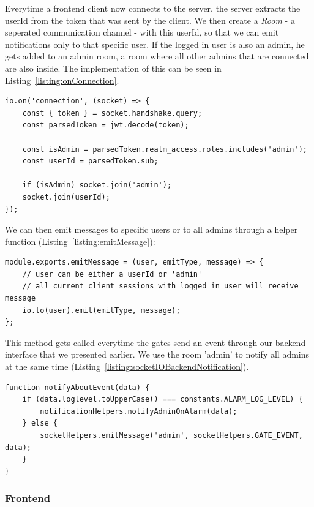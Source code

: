 Everytime a frontend client now connects to the server, the server extracts the userId from the token that was sent by the client. We then create a \emph{Room}\cite{socketio:rooms} - a seperated communication channel - with this userId, so that we can emit notifications only to that specific user. If the logged in user is also an admin, he gets added to an admin room, a room where all other admins that are connected are also inside. The implementation of this can be seen in Listing~\ref{listing:onConnection}.

\begin{lstlisting}[label={listing:onConnection},caption={Handling client connections to Socket.IO server}]
io.on('connection', (socket) => {
	const { token } = socket.handshake.query;
	const parsedToken = jwt.decode(token);

	const isAdmin = parsedToken.realm_access.roles.includes('admin');
	const userId = parsedToken.sub;

	if (isAdmin) socket.join('admin');
	socket.join(userId);
});
\end{lstlisting}

We can then emit messages to specific users or to all admins through a helper function (Listing~\ref{listing:emitMessage}):
\begin{lstlisting}[label={listing:emitMessage},caption={Helper function for emitting notifications}]
module.exports.emitMessage = (user, emitType, message) => {
	// user can be either a userId or 'admin'
	// all current client sessions with logged in user will receive message
	io.to(user).emit(emitType, message);
};
\end{lstlisting}

This method gets called everytime the gates send an event through our backend interface that we presented earlier. We use the room 'admin' to notify all admins at the same time (Listing~\ref{listing:socketIOBackendNotification}).

\begin{lstlisting}[label={listing:socketIOBackendNotification},caption={Emission of notification to all admins}]
function notifyAboutEvent(data) {
    if (data.loglevel.toUpperCase() === constants.ALARM_LOG_LEVEL) {
        notificationHelpers.notifyAdminOnAlarm(data);
    } else {
        socketHelpers.emitMessage('admin', socketHelpers.GATE_EVENT, data);
    }
}
\end{lstlisting}

\subsubsection{Frontend}
\label{Frontend}

